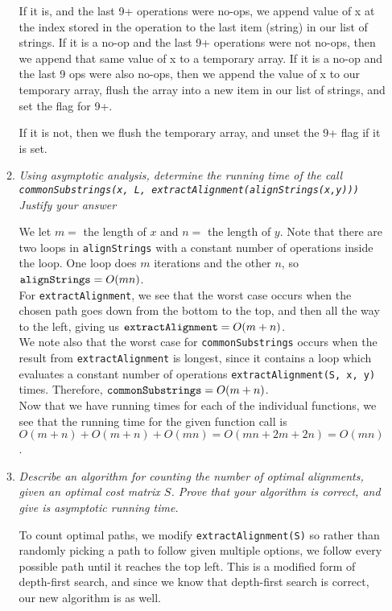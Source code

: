 \documentclass[12pt]{article}
\begin{document}
\begin{enumerate}
\begin{enumerate}
            If it is, and the last 9+ operations were no-ops, we append value of x at the index stored in the operation to the last item (string) in our list of strings. If it is a no-op and the last 9+ operations were not no-ops, then we append that same value of x to a temporary array. If it is a no-op and the last 9 ops were also no-ops, then we append the value of x to our temporary array, flush the array into a new item in our list of strings, and set the flag for 9+. 
            
            If it is not, then we flush the temporary array, and unset the 9+ flag if it is set.
        	
        	\item \textit{Using asymptotic analysis, determine the running time of the call \\{\tt commonSubstrings(x, L, extractAlignment(alignStrings(x,y)))}} \\
        	\textit{Justify your answer}
            
            We let $m =$ the length of $x$ and $n = $ the length of $y$.
            Note that there are two loops in {\tt alignStrings} with a constant number of operations inside the loop. One loop does $m$ iterations and the other $n$, so ${\tt alignStrings} = O(mn)$.\\
            For {\tt extractAlignment}, we see that the worst case occurs when the chosen path goes down from the bottom to the top, and then all the way to the left, giving us ${\tt extractAlignment} = O(m + n)$.\\
            We note also that the worst case for {\tt commonSubstrings} occurs when the result from {\tt extractAlignment} is longest, since it contains a loop which evaluates a constant number of operations {\tt extractAlignment(S, x, y)} times. Therefore,  ${\tt commonSubstrings} = O(m + n)$.\\
            Now that we have running times for each of the individual functions, we see that the running time for the given function call is $O(m+n) + O(m+n) + O(mn) = O(mn + 2m + 2n) = \boxed{O(mn)}$.
        
        	\item \textit{Describe an algorithm for counting the number of optimal alignments, given an optimal cost matrix $S$. Prove that your algorithm is correct, and give is asymptotic running time.}
        	
        	To count optimal paths, we modify {\tt extractAlignment(S)} so rather than randomly picking a path to follow given multiple options, we follow every possible path until it reaches the top left. This is a modified form of depth-first search, and since we know that depth-first search is correct, our new algorithm is as well. 
        	

\end{enumerate}
\end{enumerate}
\end{document}
